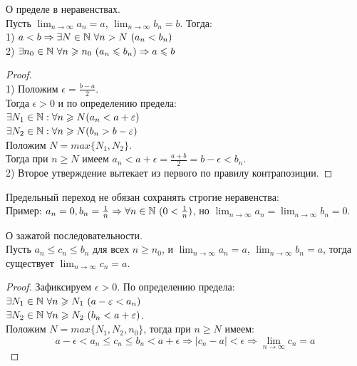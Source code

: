    \begin{theorem}{О пределе в неравенствах.}
        \\
        Пусть $\lim_{n \to \infty} a_{n} = a$, $\lim_{n \to \infty} b_{n} = b$. Тогда:\\
        1) $a < b \Rightarrow \exists N \in \N \ \forall n > N \ (a_{n} < b_{n})$\\
        2) $\exists n_0 \in \N \ \forall n \geq n_0 \ (a_{n} \leq b_{n}) \Rightarrow a \leq b$
    \end{theorem}

    \begin{proof} \ \\
        1) Положим $\epsilon = \frac{b-a}{2}$.\\
        Тогда $\epsilon > 0$ и по определению предела:\\
        $\exists N_1 \in \mathbb{N} : \forall n \geqslant N (a_{n} < a+\varepsilon)$\\
        $\exists N_2 \in \mathbb{N} : \forall n \geqslant N (b_{n} > b-\varepsilon)$\\
        Положим $N = max\{N_1, N_2\}$.\\
        Тогда при $n \geq N$ имеем $a_{n} < a+\epsilon = \frac{a+b}{2} = b-\epsilon  < b_{n}$.\\
        2) Второе утверждение вытекает из первого по правилу контрапозиции.
    \end{proof}
    
    \begin{note}
        Предельный переход не обязан сохранять строгие неравенства:\\
        Пример: $a_{n} = 0, b_{n} = \frac{1}{n} \Rightarrow \forall n \in \mathbb{N} \ (0 < \frac{1}{n})$, но $\lim_{n \to \infty} a_{n} = \lim_{n \to \infty} b_{n} = 0$.
    \end{note}

    \begin{theorem}{О зажатой последовательности.}
        \\
        Пусть $a_{n} \leq c_{n} \leq b_{n}$ для всех $n \geq n_0$, и $\lim_{n \to \infty} a_{n} = a$, $\lim_{n \to \infty} b_{n} = a$, тогда существует $\lim_{n \to \infty} c_{n} = a$.
    \end{theorem}

    \begin{proof}
        Зафиксируем $\epsilon > 0$. По определению предела:\\
        $\exists N_1 \in \N \ \forall n \geq N_1 \ (a-\epsilon < a_{n})$\\
        $\exists N_2 \in \N \ \forall n \geq N_2 \ (b_{n} < a+\epsilon)$.\\
        Положим $N = max\{N_1, N_2, n_{0}\}$, тогда при $n \geq N$ имеем:
        \[a-\epsilon < a_{n} \leq c_{n} \leq b_{n} < a+\epsilon \Rightarrow |c_{n} - a| < \epsilon \Rightarrow \lim_{n \to \infty} c_{n} = a\]
    \end{proof}

